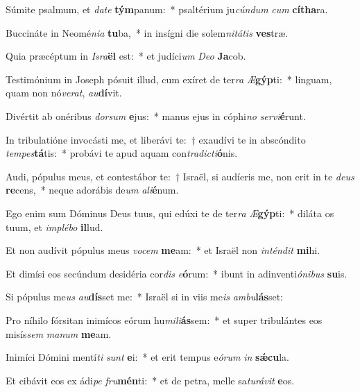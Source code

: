 \item Súmite psalmum, et \textit{da}\textit{te} \textbf{tým}panum:~* psaltérium ju\textit{cún}\textit{dum} \textit{cum} \textbf{cí}\textbf{tha}ra.
\item Buccináte in Neomé\textit{ni}\textit{a} \textbf{tu}ba,~* in insígni die solem\textit{ni}\textit{tá}\textit{tis} \textbf{ves}træ.
\item Quia præcéptum in \textit{Is}\textit{ra}\textbf{ël} est:~* et judíci\textit{um} \textit{De}\textit{o} \textbf{Ja}cob.
\item Testimónium in Joseph pósuit illud, cum exíret de ter\textit{ra} \textit{Æ}\textbf{gýp}ti:~* linguam, quam non nó\textit{ve}\textit{rat}, \textit{au}\textbf{dí}vit.
\item Divértit ab onéribus \textit{dor}\textit{sum} \textbf{e}jus:~* manus ejus in cóphi\textit{no} \textit{ser}\textit{vi}\textbf{é}runt.
\item In tribulatióne invocásti me, et liberávi te:~† exaudívi te in abscóndito \textit{tem}\textit{pes}\textbf{tá}tis:~* probávi te apud aquam con\textit{tra}\textit{dic}\textit{ti}\textbf{ó}nis.
\item Audi, pópulus meus, et contestábor te:~† Israël, si audíeris me, non erit in te \textit{de}\textit{us} \textbf{re}cens,~* neque adorábis de\textit{um} \textit{a}\textit{li}\textbf{é}num.
\item Ego enim sum Dóminus Deus tuus, qui edúxi te de ter\textit{ra} \textit{Æ}\textbf{gýp}ti:~* diláta os tuum, et \textit{im}\textit{plé}\textit{bo} \textbf{il}lud.
\item Et non audívit pópulus meus \textit{vo}\textit{cem} \textbf{me}am:~* et Israël non \textit{in}\textit{tén}\textit{dit} \textbf{mi}hi.
\item Et dimísi eos secúndum desidéria cor\textit{dis} \textit{e}\textbf{ó}rum:~* ibunt in adinventi\textit{ó}\textit{ni}\textit{bus} \textbf{su}is.
\item Si pópulus me\textit{us} \textit{au}\textbf{dís}set me:~* Israël si in viis me\textit{is} \textit{am}\textit{bu}\textbf{lás}set:
\item Pro níhilo fórsitan inimícos eórum hu\textit{mi}\textit{li}\textbf{ás}sem:~* et super tribulántes eos misís\textit{sem} \textit{ma}\textit{num} \textbf{me}am.
\item Inimíci Dómini mentí\textit{ti} \textit{sunt} \textbf{e}i:~* et erit tempus e\textit{ó}\textit{rum} \textit{in} \textbf{sǽ}\textbf{cu}la.
\item Et cibávit eos ex ádi\textit{pe} \textit{fru}\textbf{mén}ti:~* et de petra, melle sa\textit{tu}\textit{rá}\textit{vit} \textbf{e}os.
